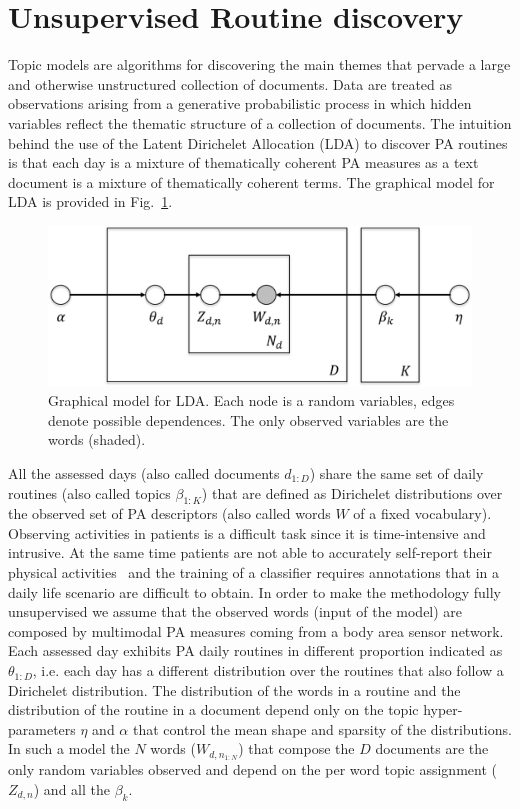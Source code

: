 \section{Unsupervised Routine discovery}
Topic models are algorithms for discovering the main themes that pervade a large and otherwise unstructured collection of documents. Data are treated as observations arising from a generative probabilistic process in which hidden variables reflect the thematic structure of a collection of documents. The intuition behind the use of the Latent Dirichelet Allocation (LDA) to discover PA routines is that each day is a mixture of thematically coherent PA measures as a text document is a mixture of thematically coherent terms. The graphical model for LDA is provided in Fig.~\ref{fig:LDA_model}.
\begin{figure}[ht]
\centering
    \includegraphics[width=.40\textwidth]{figure/eps/LDA_model.eps}
  \caption{Graphical model for LDA. Each node is a random variables, edges denote possible dependences. The only observed variables are the words (shaded).}\label{fig:LDA_model}
\end{figure}
All the assessed days (also called documents $d_{1:D}$) share the same set of daily routines (also called topics $\beta_{1:K}$) that are defined as Dirichelet distributions over the observed set of PA descriptors (also called words $W$ of a fixed vocabulary). Observing activities in patients is a difficult task since it is time-intensive and intrusive. At the same time patients are not able to accurately self-report their physical activities~\cite{Pitta_2007} and the training of a classifier requires annotations that in a daily life scenario are difficult to obtain. In order to make the methodology fully unsupervised we assume that the observed words (input of the model) are composed by multimodal PA measures coming from a body area sensor network.
Each assessed day exhibits PA daily routines in different proportion indicated as $\theta_{1:D}$, i.e. each day has a different distribution over the routines that also follow a Dirichelet distribution. The distribution of the words in a routine and the distribution of the routine in a document depend only on the topic hyper-parameters $\eta$ and $\alpha$ that control the mean shape and sparsity of the distributions. In such a model the $N$ words ($W_{d,n_{1:N}}$) that compose the $D$ documents are the only random variables observed and depend on the per word topic assignment ($Z_{d,n}$) and all the $\beta_{k}$.
